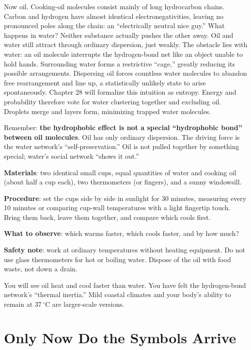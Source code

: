 Now oil. Cooking-oil molecules consist mainly of long hydrocarbon chains. Carbon and hydrogen have almost identical electronegativities, leaving no pronounced poles along the chain: an ``electrically neutral nice guy.'' What happens in water? Neither substance actually pushes the other away. Oil and water still attract through ordinary dispersion, just weakly. The obstacle lies with water: an oil molecule interrupts the hydrogen-bond net like an object unable to hold hands. Surrounding water forms a restrictive ``cage,'' greatly reducing its possible arrangements. Dispersing oil forces countless water molecules to abandon free rearrangement and line up, a statistically unlikely state to arise spontaneously. Chapter 28 will formalize this intuition as entropy. Energy and probability therefore vote for water clustering together and excluding oil. Droplets merge and layers form, minimizing trapped water molecules.

Remember: \textbf{the hydrophobic effect is not a special ``hydrophobic bond'' between oil molecules}. Oil has only ordinary dispersion. The driving force is the water network's ``self-preservation.'' Oil is not pulled together by something special; water's social network ``shows it out.''

\begin{shiyan}
\textbf{Materials}: two identical small cups, equal quantities of water and cooking oil (about half a cup each), two thermometers (or fingers), and a sunny windowsill.

\textbf{Procedure}: set the cups side by side in sunlight for 30 minutes, measuring every 10 minutes or comparing cup-wall temperatures with a light fingertip touch. Bring them back, leave them together, and compare which cools first.

\textbf{What to observe}: which warms faster, which cools faster, and by how much?

\textbf{Safety note}: work at ordinary temperatures without heating equipment. Do not use glass thermometers for hot or boiling water. Dispose of the oil with food waste, not down a drain.

You will see oil heat and cool faster than water. You have felt the hydrogen-bond network's ``thermal inertia.'' Mild coastal climates and your body's ability to remain at $37\,^{\circ}\mathrm{C}$ are larger-scale versions.
\end{shiyan}

\section{Only Now Do the Symbols Arrive}

